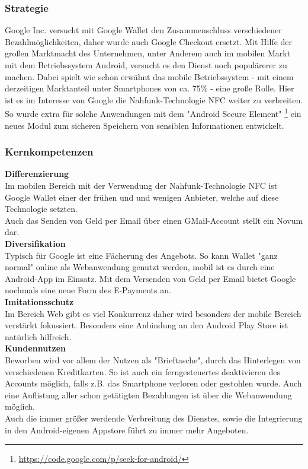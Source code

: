 	
\subsubsection{Strategie}
Google Inc. versucht mit Google Wallet den Zusammenschluss verschiedener Bezahlmöglichkeiten, daher wurde auch Google Checkout ersetzt.
Mit Hilfe der großen Marktmacht des Unternehmen, unter Anderem auch im mobilen Markt mit dem Betriebssystem Android, versucht es den Dienst noch populärerer zu machen. Dabei spielt wie schon erwähnt das mobile Betriebssystem - mit einem derzeitigen Marktanteil unter Smartphones von ca. 75\% - eine große Rolle. Hier ist es im Interesse von Google die Nahfunk-Technologie NFC weiter zu verbreiten. So wurde extra für solche Anwendungen mit dem "Android Secure Element" \footnote{\url{https://code.google.com/p/seek-for-android/}} ein neues Modul zum sicheren Speichern von sensiblen Informationen entwickelt.


\subsubsection{Kernkompetenzen}
\textbf{Differenzierung}\\
Im mobilen Bereich mit der Verwendung der Nahfunk-Technologie NFC ist Google Wallet einer der frühen und und wenigen Anbieter, welche auf diese Technologie setzten.\\
Auch das Senden von Geld per Email über einen GMail-Account stellt ein Novum dar.\\

\textbf{Diversifikation}\\
Typisch für Google ist eine Fächerung des Angebots. So kann Wallet "ganz normal" online als Webanwendung genutzt werden, mobil ist es durch eine Android-App im Einsatz. Mit dem Versenden von Geld per Email bietet Google nochmals eine neue Form des E-Payments an.\\

\textbf{Imitationsschutz}\\
Im Bereich Web gibt es viel Konkurrenz daher wird besonders der mobile Bereich verstärkt fokussiert. Besonders eine Anbindung an den Android Play Store ist natürlich hilfreich.\\

\textbf{Kundennutzen}\\
Beworben wird vor allem der Nutzen als "Brieftasche", durch das Hinterlegen von verschiedenen Kreditkarten. So ist auch ein ferngesteuertes deaktivieren des Accounts möglich, falls z.B. das Smartphone verloren oder gestohlen wurde. Auch eine Auflistung aller schon getätigten Bezahlungen ist über die Webanwendung möglich.\\
Auch die immer größer werdende Verbreitung des Dienstes, sowie die Integrierung in den Android-eigenen Appstore führt zu immer mehr Angeboten.\\

